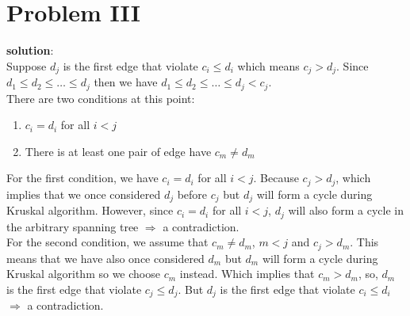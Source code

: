\section{Problem III}
\textbf{solution}:\\
Suppose $d_j$ is the first edge that violate $c_i \leq d_i$ which means $c_j > d_j$. Since $d_1 \leq d_2 \leq \dots \leq d_j$ then we have $d_1 \leq d_2 \leq \dots \leq d_j < c_j$. \\

There are two conditions at this point:
\begin{enumerate}
  \item $c_i = d_i$ for all $i < j$
  \item There is at least one pair of edge have $c_m \neq d_m$ 
\end{enumerate}

For the first condition, we have $c_i = d_i$ for all $i < j$. Because $c_j > d_j$, which implies that we once considered $d_j$ before $c_j$ but $d_j$ will form a cycle during Kruskal algorithm. However, since $c_i = d_i$ for all $i < j$, $d_j$ will also form a cycle in the arbitrary spanning tree $\Rightarrow$ a contradiction.\\

For the second condition, we assume that $c_m \neq d_m$, $m < j$ and $c_j > d_m$. This means that we have also once considered $d_m$ but $d_m$ will form a cycle during Kruskal algorithm so we choose $c_m$ instead. Which implies that $c_m > d_m$, so, $d_m$ is the first edge that violate $c_j \leq d_j$. But $d_j$ is the first edge that violate $c_i \leq d_i$ $\Rightarrow$ a contradiction. 
